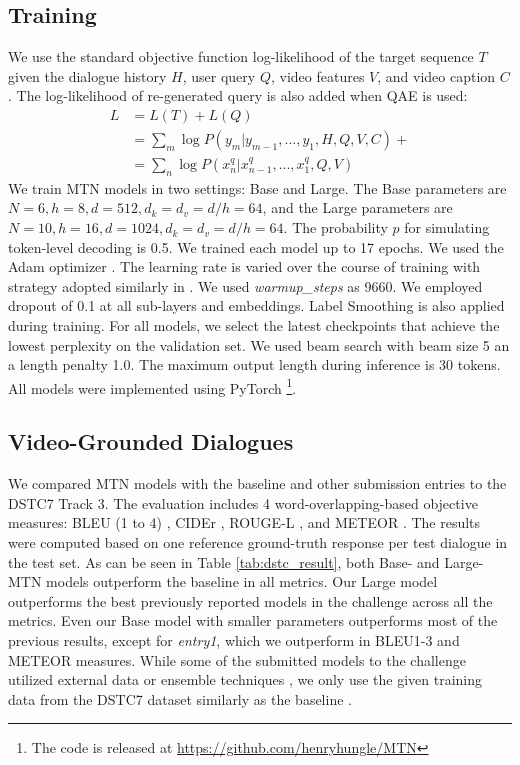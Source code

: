 \documentclass[11pt,a4paper]{article}
\begin{document}
\subsection{Training}
We use the standard objective function log-likelihood of the target sequence $T$ given the dialogue history $H$, user query $Q$, video features $V$, and video caption $C$. The log-likelihood of re-generated query is also added when QAE is used: 
\begin{align*}
    L &= L(T) + L(Q) \\
      &= \sum_{m} \log P ( y_m | y_{m-1},..., y_1, H,Q,V,C) + \\
      &= \sum_{n} \log P ( x_n^q | x_{n-1}^q,..., x_1^q, Q,V)
\end{align*}
We train MTN models in two settings: Base and Large. The Base parameters are $N=6, h=8, d=512, d_k=d_v=d/h=64$, and the Large parameters are $N=10, h=16, d=1024, d_k=d_v=d/h=64$. The probability $p$ for simulating token-level decoding is 0.5. We trained each model up to 17 epochs. We used the Adam optimizer \cite{kingma2014adam}. The learning rate is varied over the course of training with strategy adopted similarly in \cite{vaswani17attention}. We used \textit{warmup\_steps} as 9660. We employed dropout \cite{srivastava2014dropout} of 0.1 at all sub-layers and embeddings. Label Smoothing \cite{szegedy2016rethinking} is also applied during training. For all models, we select the latest checkpoints that achieve the lowest perplexity on the validation set. We used beam search with beam size 5 an a length penalty 1.0. The maximum output length during inference is 30 tokens. All models were implemented using PyTorch \cite{paszke2017automatic} \footnote{The code is released at \url{https://github.com/henryhungle/MTN}}.



\subsection{Video-Grounded Dialogues}
We compared MTN models with the baseline \cite{hori2018end} and other submission entries to the DSTC7 Track 3. The evaluation includes 4 word-overlapping-based objective measures: BLEU (1 to 4) \cite{papineni2002bleu}, CIDEr \cite{vedantam2015cider}, ROUGE-L \cite{lin2004rouge}, and METEOR \cite{banerjee2005meteor}. The results were computed based on one reference ground-truth response per test dialogue in the test set. 
As can be seen in Table \ref{tab:dstc_result}, both Base- and Large-MTN models outperform the baseline \cite{hori2018end} in all metrics.
Our Large model outperforms the best previously reported models in the challenge across all the metrics. Even our Base model with smaller parameters outperforms most of the previous results, except for \textit{entry1}, which we outperform in BLEU1-3 and METEOR measures. While some of the submitted models to the challenge utilized external data or ensemble techniques \cite{alamri2018audio}, we only use the given training data from the DSTC7 dataset similarly as the baseline \cite{hori2018end}. 
\end{document}
